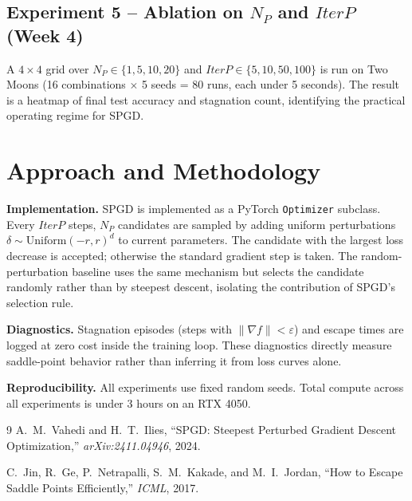 \documentclass[11pt]{article}
\begin{document}
\subsection*{Experiment 5 -- Ablation on $N_P$ and $\textit{IterP}$ (Week 4)}

A $4 \times 4$ grid over $N_P \in \{1, 5, 10, 20\}$ and $\textit{IterP} \in \{5, 10, 50, 100\}$ is run on Two Moons (16 combinations $\times$ 5 seeds = 80 runs, each under 5 seconds). The result is a heatmap of final test accuracy and stagnation count, identifying the practical operating regime for SPGD.

\section{Approach and Methodology}

\textbf{Implementation.} SPGD is implemented as a PyTorch \texttt{Optimizer} subclass. Every $\textit{IterP}$ steps, $N_P$ candidates are sampled by adding uniform perturbations $\delta \sim \text{Uniform}(-r, r)^d$ to current parameters. The candidate with the largest loss decrease is accepted; otherwise the standard gradient step is taken. The random-perturbation baseline uses the same mechanism but selects the candidate randomly rather than by steepest descent, isolating the contribution of SPGD's selection rule.

\textbf{Diagnostics.} Stagnation episodes (steps with $\|\nabla f\| < \varepsilon$) and escape times are logged at zero cost inside the training loop. These diagnostics directly measure saddle-point behavior rather than inferring it from loss curves alone.

\textbf{Reproducibility.} All experiments use fixed random seeds. Total compute across all experiments is under 3 hours on an RTX 4050.


\begin{thebibliography}{9}
A.~M.~Vahedi and H.~T.~Ilies, ``SPGD: Steepest Perturbed Gradient Descent Optimization,'' \textit{arXiv:2411.04946}, 2024.

C.~Jin, R.~Ge, P.~Netrapalli, S.~M.~Kakade, and M.~I.~Jordan, ``How to Escape Saddle Points Efficiently,'' \textit{ICML}, 2017.
\end{thebibliography}
\end{document}
